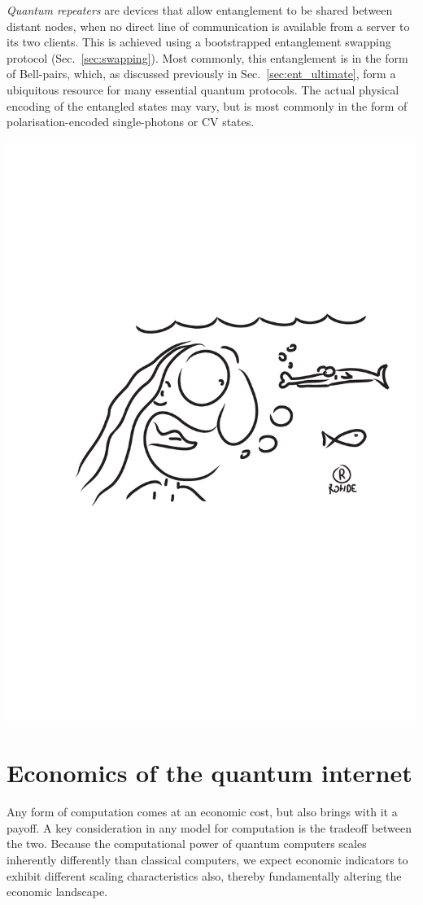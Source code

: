 \documentclass[aps, rmp, twocolumn, amsmath, amssymb, nofootinbib, superscriptaddress, longbibliography, floatfix, table-of-contents, eqsecnum]{revtex4-1}
\newcommand{\comment}[1]{{\color{blue}{\textbf{#1}}}}
\begin{document}
\textit{Quantum repeaters} are devices that allow entanglement to be shared between distant nodes, when no direct line of communication is available from a server to its two clients. This is achieved using a bootstrapped entanglement swapping protocol (Sec.~\ref{sec:swapping}). Most commonly, this entanglement is in the form of Bell-pairs, which, as discussed previously in Sec.~\ref{sec:ent_ultimate}, form a ubiquitous resource for many essential quantum protocols. The actual physical encoding of the entangled states may vary, but is most commonly in the form of polarisation-encoded single-photons or CV states.

\comment{To do by Bill Munro}

%
%

\begin{center}
	\includegraphics[width=0.6\columnwidth]{sketch_30}
\end{center}

\section{Economics of the quantum internet} 

Any form of computation comes at an economic cost, but also brings with it a payoff. A key consideration in any model for computation is the tradeoff between the two. Because the computational power of quantum computers scales inherently differently than classical computers, we expect economic indicators to exhibit different scaling characteristics also, thereby fundamentally altering the economic landscape.
\end{document}

